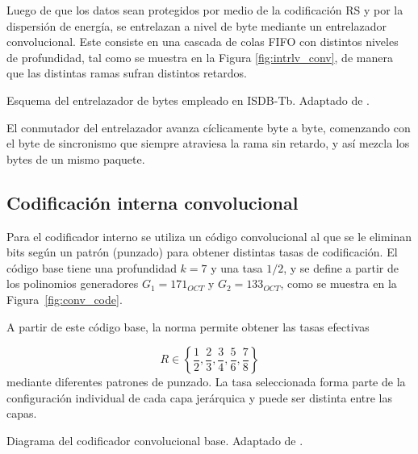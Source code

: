 Luego de que los datos sean protegidos por medio de la codificación RS y por la dispersión de energía, se entrelazan a nivel de byte mediante un entrelazador convolucional. Este consiste en una cascada de colas FIFO con distintos niveles de profundidad, tal como se muestra en la Figura \ref{fig:intrlv_conv}, de manera que las distintas ramas sufran distintos retardos.


{Esquema del entrelazador de bytes empleado en ISDB-Tb.}
{Adaptado de \cite{isdbt}.}
{\label{fig:intrlv_conv}}


El conmutador del entrelazador avanza cíclicamente byte a byte, comenzando con el byte de sincronismo que siempre atraviesa la rama sin retardo, y así mezcla los bytes de un mismo paquete.




\subsection{Codificación interna convolucional}

Para el codificador interno se utiliza un código convolucional al que se le eliminan bits según un patrón (punzado) para obtener distintas tasas de codificación. El código base tiene una profundidad \(k=7\) y una tasa \(1/2\), y se define a partir de los polinomios generadores \(G_1 = 171_{OCT}\) y \(G_2 = 133_{OCT}\), como se muestra en la Figura~\ref{fig:conv_code}.

A partir de este código base, la norma permite obtener las tasas efectivas

\begin{equation}
R \in \left\{\frac12,\frac23,\frac34,\frac56,\frac78\right\}
\end{equation}
mediante diferentes patrones de punzado. La tasa seleccionada forma parte de la configuración individual de cada capa jerárquica y puede ser distinta entre las capas.

{Diagrama del codificador convolucional base.}
{Adaptado de \cite{isdbt}.}
{\label{fig:conv_code}}

